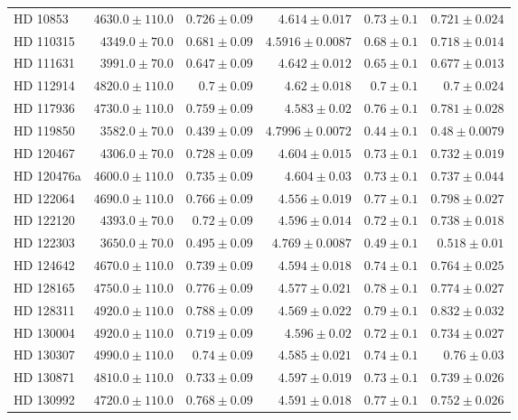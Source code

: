 \begin{longtable*}{lrrrrr}
HD 10853 & $4630.0\pm 110.0$ & $0.726\pm 0.09$ & $4.614\pm 0.017$ & $0.73\pm 0.1$ & $0.721\pm 0.024$ \\ 
HD 110315 & $4349.0\pm 70.0$ & $0.681\pm 0.09$ & $4.5916\pm 0.0087$ & $0.68\pm 0.1$ & $0.718\pm 0.014$ \\ 
HD 111631 & $3991.0\pm 70.0$ & $0.647\pm 0.09$ & $4.642\pm 0.012$ & $0.65\pm 0.1$ & $0.677\pm 0.013$ \\ 
HD 112914 & $4820.0\pm 110.0$ & $0.7\pm 0.09$ & $4.62\pm 0.018$ & $0.7\pm 0.1$ & $0.7\pm 0.024$ \\ 
HD 117936 & $4730.0\pm 110.0$ & $0.759\pm 0.09$ & $4.583\pm 0.02$ & $0.76\pm 0.1$ & $0.781\pm 0.028$ \\ 
HD 119850 & $3582.0\pm 70.0$ & $0.439\pm 0.09$ & $4.7996\pm 0.0072$ & $0.44\pm 0.1$ & $0.48\pm 0.0079$ \\ 
HD 120467 & $4306.0\pm 70.0$ & $0.728\pm 0.09$ & $4.604\pm 0.015$ & $0.73\pm 0.1$ & $0.732\pm 0.019$ \\ 
HD 120476a & $4600.0\pm 110.0$ & $0.735\pm 0.09$ & $4.604\pm 0.03$ & $0.73\pm 0.1$ & $0.737\pm 0.044$ \\ 
HD 122064 & $4690.0\pm 110.0$ & $0.766\pm 0.09$ & $4.556\pm 0.019$ & $0.77\pm 0.1$ & $0.798\pm 0.027$ \\ 
HD 122120 & $4393.0\pm 70.0$ & $0.72\pm 0.09$ & $4.596\pm 0.014$ & $0.72\pm 0.1$ & $0.738\pm 0.018$ \\ 
HD 122303 & $3650.0\pm 70.0$ & $0.495\pm 0.09$ & $4.769\pm 0.0087$ & $0.49\pm 0.1$ & $0.518\pm 0.01$ \\ 
HD 124642 & $4670.0\pm 110.0$ & $0.739\pm 0.09$ & $4.594\pm 0.018$ & $0.74\pm 0.1$ & $0.764\pm 0.025$ \\ 
HD 128165 & $4750.0\pm 110.0$ & $0.776\pm 0.09$ & $4.577\pm 0.021$ & $0.78\pm 0.1$ & $0.774\pm 0.027$ \\ 
HD 128311 & $4920.0\pm 110.0$ & $0.788\pm 0.09$ & $4.569\pm 0.022$ & $0.79\pm 0.1$ & $0.832\pm 0.032$ \\ 
HD 130004 & $4920.0\pm 110.0$ & $0.719\pm 0.09$ & $4.596\pm 0.02$ & $0.72\pm 0.1$ & $0.734\pm 0.027$ \\ 
HD 130307 & $4990.0\pm 110.0$ & $0.74\pm 0.09$ & $4.585\pm 0.021$ & $0.74\pm 0.1$ & $0.76\pm 0.03$ \\ 
HD 130871 & $4810.0\pm 110.0$ & $0.733\pm 0.09$ & $4.597\pm 0.019$ & $0.73\pm 0.1$ & $0.739\pm 0.026$ \\ 
HD 130992 & $4720.0\pm 110.0$ & $0.768\pm 0.09$ & $4.591\pm 0.018$ & $0.77\pm 0.1$ & $0.752\pm 0.026$ \\ 

\end{longtable*}

